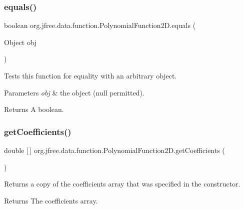 \subsubsection{\texorpdfstring{equals()}{equals()}}
{\footnotesize\ttfamily boolean org.\+jfree.\+data.\+function.\+Polynomial\+Function2\+D.\+equals (\begin{DoxyParamCaption}\item[{Object}]{obj }\end{DoxyParamCaption})}

Tests this function for equality with an arbitrary object.


\begin{DoxyParams}{Parameters}
{\em obj} & the object ({\ttfamily null} permitted).\\
\hline
\end{DoxyParams}
\begin{DoxyReturn}{Returns}
A boolean. 
\end{DoxyReturn}
\mbox{\label{classorg_1_1jfree_1_1data_1_1function_1_1_polynomial_function2_d_ae6066b44c09588d96910269c3eb16b64}} 
\subsubsection{\texorpdfstring{get\+Coefficients()}{getCoefficients()}}
{\footnotesize\ttfamily double \mbox{[}$\,$\mbox{]} org.\+jfree.\+data.\+function.\+Polynomial\+Function2\+D.\+get\+Coefficients (\begin{DoxyParamCaption}{ }\end{DoxyParamCaption})}

Returns a copy of the coefficients array that was specified in the constructor.

\begin{DoxyReturn}{Returns}
The coefficients array. 
\end{DoxyReturn}
\mbox{\label{classorg_1_1jfree_1_1data_1_1function_1_1_polynomial_function2_d_aa4c10c9436b2390c462b82393bf44493}} 
